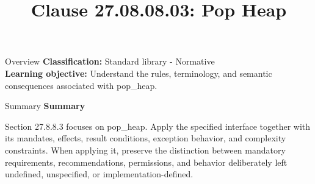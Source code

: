 \documentclass[10pt,letterpaper]{article}
\title{Clause 27.08.08.03: Pop Heap}
\author{}
\date{}
\begin{document}
\maketitle
\begin{CornellOverviewBox}{Overview}
\textbf{Classification:} Standard library - Normative\\[2pt]
\textbf{Learning objective:} Understand the rules, terminology, and semantic consequences associated with pop\_heap.
\end{CornellOverviewBox}\begin{CornellSummaryBox}{Summary}
{\sffamily\bfseries\color{Accent} Summary}\par\vspace{3pt}Section 27.8.8.3 focuses on pop\_heap. Apply the specified interface together with its mandates, effects, result conditions, exception behavior, and complexity constraints. When applying it, preserve the distinction between mandatory requirements, recommendations, permissions, and behavior deliberately left undefined, unspecified, or implementation-defined.
\end{CornellSummaryBox}
\end{document}
